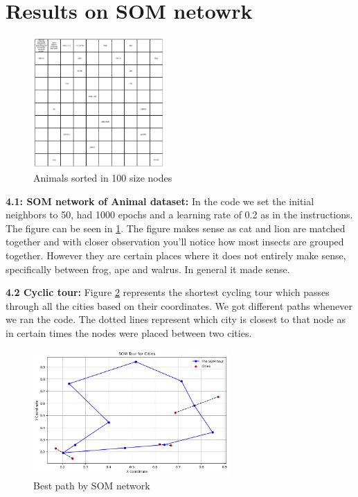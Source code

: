 \documentclass[a4paper]{article}
\begin{document}
\section{Results on SOM netowrk}
\begin{figure} [htb]
    \centering
    \includegraphics[width=5cm]{Labs/Lab 2/Results/animal_som.png}
    \caption{Animals sorted in 100 size nodes}
    \label{fig:SOM_animals}
\end{figure}
\textbf{4.1: SOM network of Animal dataset: } In the code we set the initial neighbors to 50, had 1000 epochs and a learning rate of 0.2 as in the instructions. The figure can be seen in \ref{fig:SOM_animals}. The figure makes sense as cat and lion are matched together and with closer observation you'll notice how most insects are grouped together. However they are certain places where it does not entirely make sense, specifically between frog, ape and walrus. In general it made sense. 



\textbf{4.2 Cyclic tour: }Figure \ref{fig:SOM_cycle} represents the shortest cycling tour which passes through all the cities based on their coordinates. We got different paths whenever we ran the code. The dotted lines represent which city is closest to that node as in certain times the nodes were placed between two cities.  
\begin{figure}[htb]
    \centering
\includegraphics[width=7.5cm]{Labs/Lab 2/Results/Cyclic_som.png}
    \caption{Best path by SOM network}
    \label{fig:SOM_cycle}
\end{figure}
\end{document}
